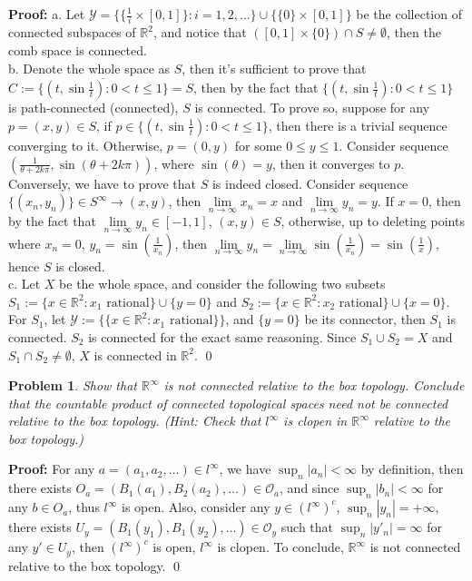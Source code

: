 \documentclass[12pt]{article}
\newtheorem{problem}{Problem}
\begin{document}
\textbf{Proof:} a. Let $\mathcal{Y}=\{\{\frac{1}{i}\times [0,1]\}: i=1, 2, \dots\}\cup\{\{0\}\times[0,1]\}$ be the collection of connected subspaces of $\mathbb{R}^2$, and notice that $([0,1]\times \{0\})\cap S\neq\emptyset$, then the comb space is connected. \\
\indent b. Denote the whole space as $S$, then it's sufficient to prove that $C:=\overline{\{(t, \sin\frac{1}{t}): 0<t\leq 1\}}=S$, then by the fact that $\{(t, \sin\frac{1}{t}): 0<t\leq 1\}$ is path-connected (connected), $S$ is connected. To prove so, suppose for any $p=(x,y)\in S$, if $p\in \{(t, \sin\frac{1}{t}): 0<t\leq 1\}$, then there is a trivial sequence converging to it. Otherwise, $p=(0,y)$ for some $0\leq y\leq 1$. Consider sequence $(\frac{1}{\theta+2k\pi}, \sin(\theta+2k\pi))$, where $\sin(\theta)=y$, then it converges to $p$. Conversely, we have to prove that $S$ is indeed closed. Consider sequence $\{(x_n,y_n)\}\in S^\infty\to (x,y)$, then $\lim\limits_{n\to\infty}x_n=x$ and $\lim\limits_{n\to\infty}y_n=y$. If $x=0$, then by the fact that $\lim\limits_{n\to\infty}y_n\in [-1, 1]$, $(x,y)\in S$, otherwise, up to deleting points where $x_n=0$,  $y_n=\sin(\frac{1}{x_n})$, then $\lim\limits_{n\to\infty}y_n=\lim\limits_{n\to\infty}\sin(\frac{1}{x_n})=\sin(\frac{1}{x})$, hence $S$ is closed. \\
\indent c. Let $X$ be the whole space, and consider the following two subsets $S_1:=\{x\in\mathbb{R}^2: x_1\text{ rational}\}\cup \{y=0\}$ and $S_2:=\{x\in\mathbb{R}^2: x_2\text{ rational}\}\cup\{x=0\}$. For $S_1$, let $\mathcal{Y}:=\{\{x\in\mathbb{R}^2:x_{1}\text{ rational}\}\}$, and $\{y=0\}$ be its connector, then $S_1$ is connected. $S_2$ is connected for the exact same reasoning. Since $S_{1}\cup S_2=X$ and $S_1\cap S_2\neq\emptyset$, $X$ is connected in $\mathbb{R}^2$. \qed 
\\
\begin{problem}
Show that $\mathbb{R}^\infty$ is not connected relative to the box topology. Conclude that the countable product of connected topological spaces need not be connected relative to the box topology. (Hint: Check that $l^\infty$ is clopen in $\mathbb{R}^\infty$ relative to the box topology.)
\end{problem}

\textbf{Proof:} For any $a=(a_1, a_2, \dots)\in l^\infty$, we have $\sup_n |a_n|<\infty$ by definition, then there exists $O_a=(B_{1}(a_1), B_2(a_2), \dots)\in\mathcal{O}_a$, and since $\sup_n |b_n|<\infty$ for any $b\in O_a$, thus $l^\infty$ is open. Also, consider any $y\in(l^{\infty})^{c}$, $\sup_n |y_n|=+\infty$, there exists $U_y=(B_1(y_1), B_1(y_2), \dots)\in\mathcal{O}_y$ such that $\sup_n |y'_n|=\infty$ for any $y'\in U_y$, then $(l^\infty)^c$ is open, $l^\infty$ is clopen. To conclude, $\mathbb{R}^\infty$ is not connected relative to the box topology. \qed
\end{document}
